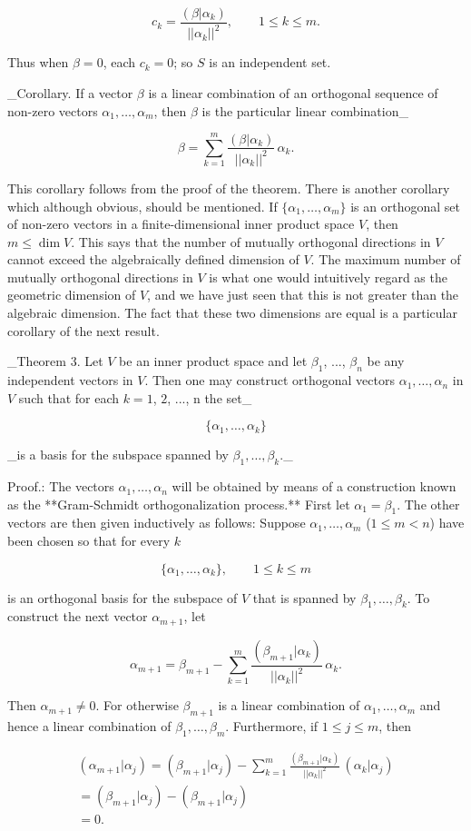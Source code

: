 \[c_{k}=\frac{(\beta|\alpha_{k})}{||\alpha_{k}||^{2}},\qquad 1\leq k\leq m.\]

Thus when \(\beta=0\), each \(c_{k}=0\); so \(S\) is an independent set.

_Corollary. If a vector \(\beta\) is a linear combination of an orthogonal sequence of non-zero vectors \(\alpha_{1},\ldots,\alpha_{m}\), then \(\beta\) is the particular linear combination_

\[\beta=\sum\limits_{k=1}^{m}\frac{(\beta|\alpha_{k})}{||\alpha_{k}||^{2}}\, \alpha_{k}.\]

This corollary follows from the proof of the theorem. There is another corollary which although obvious, should be mentioned. If \(\{\alpha_{1},\ldots,\alpha_{m}\}\) is an orthogonal set of non-zero vectors in a finite-dimensional inner product space \(V\), then \(m\leq\dim V\). This says that the number of mutually orthogonal directions in \(V\) cannot exceed the algebraically defined dimension of \(V\). The maximum number of mutually orthogonal directions in \(V\) is what one would intuitively regard as the geometric dimension of \(V\), and we have just seen that this is not greater than the algebraic dimension. The fact that these two dimensions are equal is a particular corollary of the next result.

_Theorem 3. Let \(V\) be an inner product space and let \(\beta_{1}\), ..., \(\beta_{n}\) be any independent vectors in \(V\). Then one may construct orthogonal vectors \(\alpha_{1},\ldots,\alpha_{n}\) in \(V\) such that for each \(k=1\), \(2\), ..., n the set_

\[\{\alpha_{1},\ldots,\alpha_{k}\}\]

_is a basis for the subspace spanned by \(\beta_{1},\ldots,\beta_{k}\)._

Proof.: The vectors \(\alpha_{1},\ldots,\alpha_{n}\) will be obtained by means of a construction known as the **Gram-Schmidt orthogonalization process.** First let \(\alpha_{1}=\beta_{1}\). The other vectors are then given inductively as follows: Suppose \(\alpha_{1},\ldots,\alpha_{m}\) (\(1\leq m<n\)) have been chosen so that for every \(k\)

\[\{\alpha_{1},\ldots,\alpha_{k}\},\qquad 1\leq k\leq m\]

is an orthogonal basis for the subspace of \(V\) that is spanned by \(\beta_{1},\ldots,\beta_{k}\). To construct the next vector \(\alpha_{m+1}\), let

\[\alpha_{m+1}=\beta_{m+1}-\sum\limits_{k=1}^{m}\frac{(\beta_{m+1}|\alpha_{k})} {||\alpha_{k}||^{2}}\,\alpha_{k}.\]

Then \(\alpha_{m+1}\neq 0\). For otherwise \(\beta_{m+1}\) is a linear combination of \(\alpha_{1},\ldots,\alpha_{m}\) and hence a linear combination of \(\beta_{1},\ldots,\beta_{m}\). Furthermore, if \(1\leq j\leq m\), then

\[\begin{array}{l}(\alpha_{m+1}|\alpha_{j})=(\beta_{m+1}|\alpha_{j})-\sum \limits_{k=1}^{m}\frac{(\beta_{m+1}|\alpha_{k})}{||\alpha_{k}||^{2}}\,(\alpha_ {k}|\alpha_{j})\\ =(\beta_{m+1}|\alpha_{j})-(\beta_{m+1}|\alpha_{j})\\ =0.\end{array}\] 
